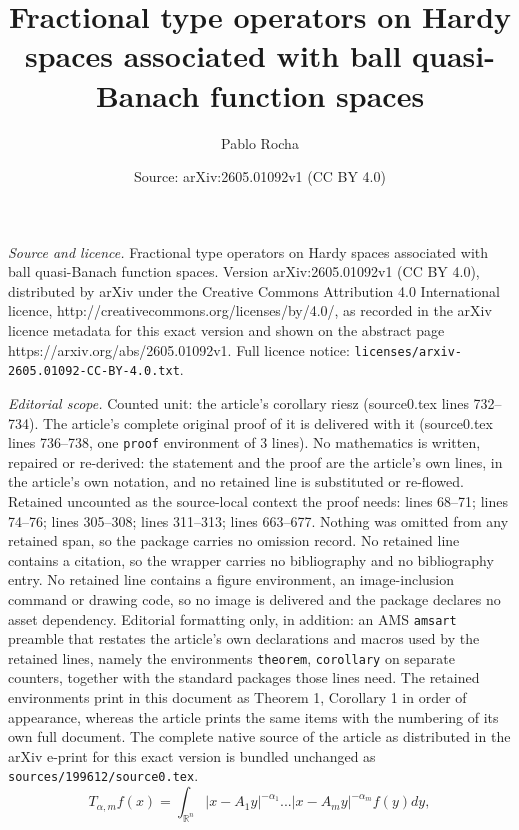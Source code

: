 \documentclass[10pt,a4paper]{amsart}
\title{Fractional type operators on Hardy spaces associated with ball quasi-Banach function spaces}
\author{Pablo Rocha}
\date{Source: arXiv:2605.01092v1 (CC BY 4.0)}
\begin{document}
\maketitle

\noindent\emph{Source and licence.} Fractional type operators on Hardy spaces associated with ball quasi-Banach function spaces. Version arXiv:2605.01092v1 (CC BY 4.0), distributed by arXiv under the Creative Commons Attribution 4.0 International licence, http://creativecommons.org/licenses/by/4.0/, as recorded in the arXiv licence metadata for this exact version and shown on the abstract page https://arxiv.org/abs/2605.01092v1. Full licence notice: \texttt{licenses/arxiv-2605.01092-CC-BY-4.0.txt}.\par\smallskip

\noindent\textit{Editorial scope.} Counted unit: the article's corollary riesz (source0.tex lines 732--734). The article's complete original proof of it is delivered with it (source0.tex lines 736--738, one \texttt{proof} environment of 3 lines). No mathematics is written, repaired or re-derived: the statement and the proof are the article's own lines, in the article's own notation, and no retained line is substituted or re-flowed.  Retained uncounted as the source-local context the proof needs: lines 68--71; lines 74--76; lines 305--308; lines 311--313; lines 663--677.  Nothing was omitted from any retained span, so the package carries no omission record.  No retained line contains a citation, so the wrapper carries no bibliography and no bibliography entry.  No retained line contains a figure environment, an image-inclusion command or drawing code, so no image is delivered and the package declares no asset dependency.  Editorial formatting only, in addition: an AMS \texttt{amsart} preamble that restates the article's own declarations and macros used by the retained lines, namely the environments \texttt{theorem}, \texttt{corollary} on separate counters, together with the standard packages those lines need.  The retained environments print in this document as Theorem 1, Corollary 1 in order of appearance, whereas the article prints the same items with the numbering of its own full document.  The complete native source of the article as distributed in the arXiv e-print for this exact version is bundled unchanged as \texttt{sources/199612/source0.tex}.
\begin{equation}
T_{\alpha, m}f(x)=\int_{\mathbb{R}^{n}} \left\vert x-A_{1}y\right\vert ^{-\alpha
_{1}}...\left\vert x-A_{m}y\right\vert ^{-\alpha _{m}}f(y)dy,  \label{T}
\end{equation}
\end{document}
